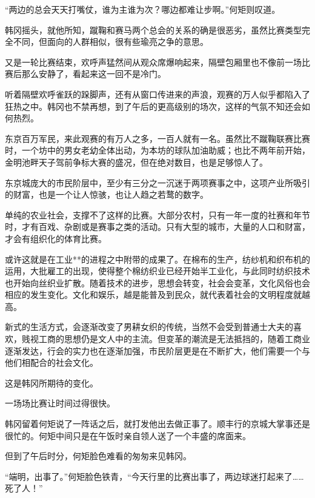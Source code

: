 “两边的总会天天打嘴仗，谁为主谁为次？哪边都难让步啊。”何矩则叹道。

韩冈摇头，就他所知，蹴鞠和赛马两个总会的关系的确是很恶劣，虽然比赛类型完全不同，但面向的人群相似，很有些瑜亮之争的意思。

又是一轮比赛结束，欢呼声猛然间从观众席爆响起来，隔壁包厢里也不像前一场比赛后那么安静了，看起来这一回不是冷门。

听着隔壁欢呼雀跃的跺脚声，还有从窗口传进来的声浪，观赛的万人似乎都陷入了狂热之中。韩冈也不禁再想，到了午后的更高级别的场次，这样的气氛不知还会如何热烈。

东京百万军民，来此观赛的有万人之多，一百人就有一名。虽然比不蹴鞠联赛比赛时，一个坊中的男女老幼全体出动，为本坊的球队加油助威；也比不两年前开始，金明池畔天子驾前争标大赛的盛况，但在绝对数目，也是足够惊人了。

东京城庞大的市民阶层中，至少有三分之一沉迷于两项赛事之中，这项产业所吸引的财富，也是一个让人惊骇，也让人趋之若鹜的数字。

单纯的农业社会，支撑不了这样的比赛。大部分农村，只有一年一度的社赛和年节时，才有百戏、杂剧或是赛事之类的活动。只有大型的城市，大量的人口和财富，才会有组织化的体育比赛。

或许这就是在工业**的进程之中附带的成果了。在棉布的生产，纺纱机和织布机的运用，大批雇工的出现，使得整个棉纺织业已经开始半工业化，与此同时纺织技术也开始向丝织业扩散。随着技术的进步，思想会转变，社会会变革，文化风俗也会相应的发生变化。文化和娱乐，越是能普及到民众，就代表着社会的文明程度就越高。

新式的生活方式，会逐渐改变了男耕女织的传统，当然不会受到普通士大夫的喜欢，贱视工商的思想仍是文人中的主流。但变革的潮流是无法抵挡的，随着工商业逐渐发达，行会的实力也在逐渐加强，市民阶层更是在不断扩大，他们需要一个与他们相配合的社会文化。

这是韩冈所期待的变化。

一场场比赛让时间过得很快。

韩冈留着何矩说了一阵话之后，就打发他出去做正事了。顺丰行的京城大掌事还是很忙的。何矩中间只是在午饭时亲自领人送了一个丰盛的席面来。

但到了午后时分，何矩脸色难看的匆匆来见韩冈。

“端明，出事了。”何矩脸色铁青，“今天行里的比赛出事了，两边球迷打起来了……死了人！”